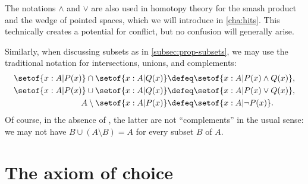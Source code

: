 The notations $\land$ and $\lor$ are also used in homotopy theory for the smash product and the wedge of pointed spaces, which we will introduce in \cref{cha:hits}.
This technically creates a potential for conflict, but no confusion will generally arise.

Similarly, when discussing subsets as in \cref{subsec:prop-subsets}, we may use the traditional notation for intersections, unions, and complements:
%
%
%
%
%
%
\begin{align*}
  \setof{x:A | P(x)} \cap \setof{x:A | Q(x)}
  &\defeq \setof{x:A | P(x) \land Q(x)},\\
  \setof{x:A | P(x)} \cup \setof{x:A | Q(x)}
  &\defeq \setof{x:A | P(x) \lor Q(x)},\\
  A \setminus \setof{x:A | P(x)}
  &\defeq \setof{x:A | \neg P(x)}.
\end{align*}
Of course, in the absence of \LEM{}, the latter are not ``complements'' in the usual sense: we may not have $B \cup (A\setminus B) = A$ for every subset $B$ of $A$.

%
%
%


\section{The axiom of choice}
